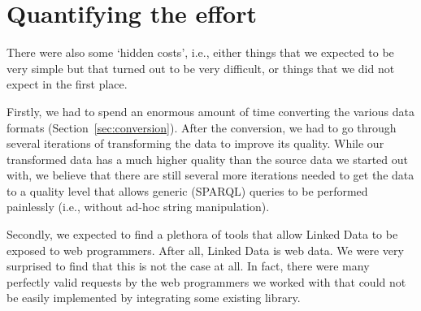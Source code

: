 \documentclass[a4paper]{scrartcl}
\newcommand{\textt}[1]{{\small \texttt{#1}}}
\begin{document}

\section{Quantifying the effort}
\label{sec:quantifying}

There were also some `hidden costs', i.e., either things that we
expected to be very simple but that turned out to be very difficult,
or things that we did not expect in the first place.

Firstly, we had to spend an enormous amount of time converting the
various data formats (Section~\ref{sec:conversion}).  After the
conversion, we had to go through several iterations of transforming
the data to improve its quality.  While our transformed data has a
much higher quality than the source data we started out with, we
believe that there are still several more iterations needed to get the
data to a quality level that allows generic (SPARQL) queries to be
performed painlessly (i.e., without ad-hoc string manipulation).

Secondly, we expected to find a plethora of tools that allow Linked
Data to be exposed to web programmers.  After all, Linked Data is web
data.  We were very surprised to find that this is not the case at
all.  In fact, there were many perfectly valid requests by the web
programmers we worked with that could not be easily implemented by
integrating some existing library.
\end{document}
